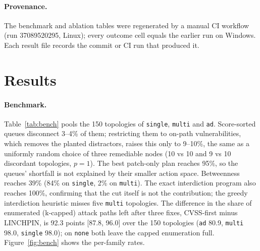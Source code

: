 \documentclass[11pt]{article}
\begin{document}
\paragraph{Provenance.} The benchmark and ablation tables were regenerated by a manual CI workflow (run 37089520295,
Linux); every outcome cell equals the earlier run on Windows. Each result file records the commit or CI run that
produced it.

\section{Results}
\label{sec:results}

\paragraph{Benchmark.} Table~\ref{tab:bench} pools the 150 topologies of \texttt{single}, \texttt{multi} and
\texttt{ad}. Score-sorted queues disconnect 3--4\% of them; restricting them to on-path vulnerabilities, which removes
the planted distractors, raises this only to 9--10\%, the same as a uniformly random choice of three remediable nodes
(10 vs 10 and 9 vs 10 discordant topologies, $p = 1$). The best patch-only plan reaches 95\%, so the queues' shortfall
is not explained by their smaller action space. Betweenness reaches 39\% (84\% on \texttt{single}, 2\% on
\texttt{multi}). The exact interdiction program also reaches 100\%, confirming that the cut itself is not the
contribution; the greedy interdiction heuristic misses five \texttt{multi} topologies. The difference in the share of
enumerated (k-capped) attack paths left after three fixes, CVSS-first minus LINCHPIN, is 92.3 points [87.8, 96.0] over
the 150 topologies (\texttt{ad} 80.9, \texttt{multi} 98.0, \texttt{single} 98.0); on \texttt{none} both leave the
capped enumeration full. Figure~\ref{fig:bench} shows the per-family rates.
\end{document}
